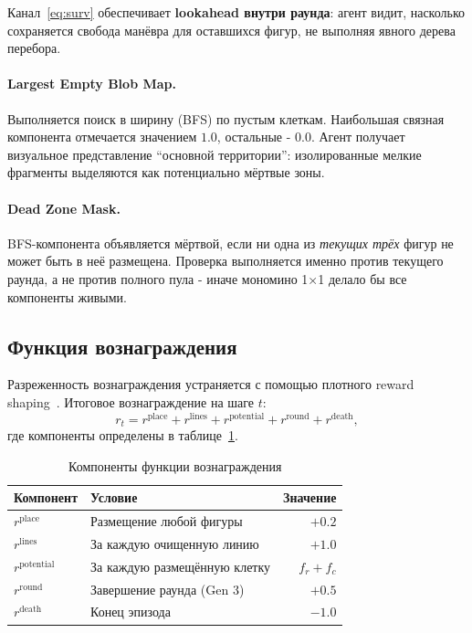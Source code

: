 \documentclass[12pt, a4paper]{article}
\begin{document}
Канал~\eqref{eq:surv} обеспечивает \textbf{lookahead внутри раунда}: агент видит, насколько сохраняется свобода манёвра для оставшихся фигур, не выполняя явного дерева перебора.

\paragraph{Largest Empty Blob Map.}
Выполняется поиск в ширину (BFS) по пустым клеткам. Наибольшая связная компонента отмечается значением $1.0$, остальные - $0.0$. Агент получает визуальное представление ``основной территории'': изолированные мелкие фрагменты выделяются как потенциально мёртвые зоны.

\paragraph{Dead Zone Mask.}
BFS-компонента объявляется мёртвой, если ни одна из \textit{текущих трёх} фигур не может быть в неё размещена. Проверка выполняется именно против текущего раунда, а не против полного пула - иначе мономино 1×1 делало бы все компоненты живыми.

\subsection{Функция вознаграждения}

Разреженность вознаграждения устраняется с помощью плотного reward shaping~\cite{ng1999}. Итоговое вознаграждение на шаге $t$:
\begin{equation}
  r_t = r^{\text{place}} + r^{\text{lines}} + r^{\text{potential}} + r^{\text{round}} + r^{\text{death}},
\end{equation}
где компоненты определены в таблице~\ref{tab:reward}.

\begin{table}[H]
  \centering
  \caption{Компоненты функции вознаграждения}
  \label{tab:reward}
  \begin{tabular}{llr}
    \toprule
    \textbf{Компонент} & \textbf{Условие} & \textbf{Значение} \\
    \midrule
    $r^{\text{place}}$    & Размещение любой фигуры          & $+0.2$ \\
    $r^{\text{lines}}$    & За каждую очищенную линию         & $+1.0$ \\
    $r^{\text{potential}}$& За каждую размещённую клетку      & $f_r + f_c$ \\
    $r^{\text{round}}$    & Завершение раунда (Gen 3)         & $+0.5$ \\
    $r^{\text{death}}$    & Конец эпизода                     & $-1.0$ \\
    \bottomrule
  \end{tabular}
\end{table}
\end{document}
